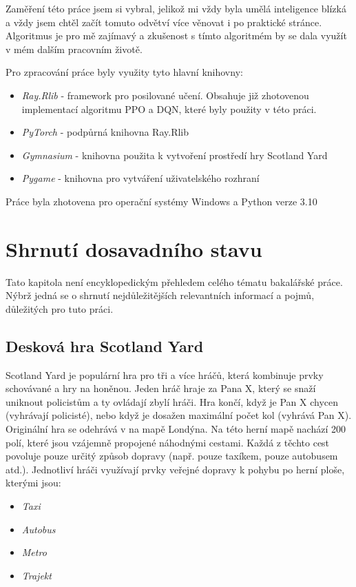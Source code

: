 Zaměření této práce jsem si vybral, jelikož mi vždy byla umělá inteligence blízká a vždy jsem chtěl začít tomuto odvětví více věnovat i po praktické stránce.
Algoritmus je pro mě zajímavý a zkušenost s tímto algoritmém by se dala využít v mém dalším pracovním životě.\page

Pro zpracování práce byly využity tyto hlavní knihovny:
\begin{itemize}
  \item \emph{Ray.Rlib} - framework pro posilované učení. Obsahuje již zhotovenou implementací algoritmu PPO a DQN, které byly použity v této práci. 
  \item \emph{PyTorch} - podpůrná knihovna Ray.Rlib
  \item \emph{Gymnasium} - knihovna použita k vytvoření prostředí hry Scotland Yard
  \item \emph{Pygame} - knihovna pro vytváření uživatelského rozhraní
\end{itemize}

Práce byla zhotovena pro operační systémy Windows a Python verze 3.10

\chapter{Shrnutí dosavadního stavu}
\label{ch:dosavadni_stav}
Tato kapitola není encyklopedickým přehledem celého tématu bakalářské práce.
Nýbrž jedná se o shrnutí nejdůležitějších relevantních informací a pojmů, důležitých pro tuto práci.

\section{Desková hra Scotland Yard}
\label{sec:deskova-hra-scotland-yard}

Scotland Yard je populární hra pro tři a více hráčů, která kombinuje prvky schovávané a hry na honěnou.
Jeden hráč hraje za Pana X, který se snaží uniknout policistům a ty ovládají zbylí hráči.
Hra končí, když je Pan X chycen (vyhrávají policisté), nebo když je dosažen maximální počet kol (vyhrává Pan X).
Originální hra se odehrává v na mapě Londýna.
Na této herní mapě nachází 200 polí, které jsou vzájemně propojené náhodnými cestami.
Každá z těchto cest povoluje pouze určitý způsob dopravy (např. pouze taxíkem, pouze autobusem atd.).
Jednotliví hráči využívají prvky veřejné dopravy k pohybu po herní ploše, kterými jsou:
\begin{itemize}
  \item \emph{Taxi}
  \item \emph{Autobus}
  \item \emph{Metro}
  \item \emph{Trajekt}
\end{itemize}

